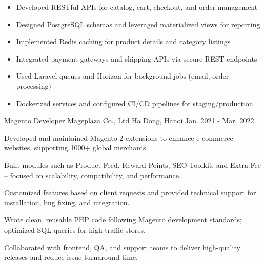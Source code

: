 \begin{cventries}
{\begin{cvitems}
        \begin{itemize}[label=•,itemsep=0.15em]
          \item {Developed RESTful APIs for catalog, cart, checkout, and order management}
          \item {Designed PostgreSQL schemas and leveraged materialized views for reporting}
          \item {Implemented Redis caching for product details and category listings}
          \item {Integrated payment gateways and shipping APIs via secure REST endpoints}
          \item {Used Laravel queues and Horizon for background jobs (email, order processing)}
          \item {Dockerized services and configured CI/CD pipelines for staging/production}
        \end{itemize}
        \vspace{0.5em}
      \end{cvitems}
    }

  \cventry
    {Magento Developer} %
    {Mageplaza Co., Ltd} %
    {Ha Dong, Hanoi} %
    {Jan. 2021 - Mar. 2022} %
    {
      \begin{cvitems} %
        \item {Developed and maintained Magento 2 extensions to enhance e-commerce websites, supporting 1000+ global merchants.}
        \item {Built modules such as Product Feed, Reward Points, SEO Toolkit, and Extra Fee – focused on scalability, compatibility, and performance.}
        \item {Customized features based on client requests and provided technical support for installation, bug fixing, and integration.}
        \item {Wrote clean, reusable PHP code following Magento development standards; optimized SQL queries for high-traffic stores.}
        \item {Collaborated with frontend, QA, and support teams to deliver high-quality releases and reduce issue turnaround time.}
      \end{cvitems}
    }

\end{cventries}
